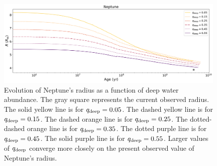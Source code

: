 \documentclass[11pt]{ucscthesisbs}
\begin{document}
\begin{figure}[ht]
 \centerline{
  \includegraphics[scale=0.40]{figures/n_cooling_radius_nz_4096_logx.png}
 }
\caption[Thermal Evolution Curves for Neptune - Radius]
{Evolution of Neptune's radius as a function of deep water abundance. The gray square represents the current observed radius. The solid yellow line is for $q_{\rm deep} = 0.05$. The dashed yellow line is for $q_{\rm deep} = 0.15$. The dashed orange line is for $q_{\rm deep} = 0.25$. The dotted-dashed orange line is for $q_{\rm deep} = 0.35$. The dotted purple line is for $q_{\rm deep} = 0.45$. The solid purple line is for $q_{\rm deep} = 0.55$. Larger values of $q_{\rm deep}$ converge more closely on the present observed value of Neptune's radius.}
\label{fig:evolve_neptune_radius}
\end{figure}
\end{document}
